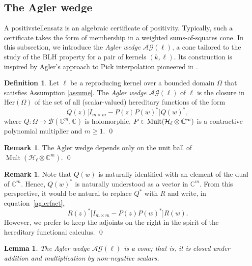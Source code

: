 \documentclass[a4paper,reqno,index]{amsart}
\newcommand{\df}[1]{{\textit{#1}}{\index{#1}}}
\numberwithin{equation}{section}
\newtheorem{lemma}[theorem]{Lemma}
\newcommand{\CC}{\mathbb{C}}
\newcommand{\Mult}{\operatorname{Mult}}
\newcommand{\cH}{\mathcal{H}}
\theoremstyle{definition}
\newtheorem{definition}[theorem]{Definition}
\newtheorem{remark}[theorem]{Remark}
\begin{document}
\subsection{The Agler wedge}
 A positivstellensatz is an algebraic certificate of positivity. Typically, such a certificate takes the form of membership in a weighted sums-of-squares cone. In this subsection, we introduce the \df{Agler wedge} $\mathcal{AG}(\ell)$, a cone tailored to the study of the BLH property for a pair of kernels $(k,\ell)$. Its construction is inspired by Agler's approach to Pick interpolation pioneered in \cite{Hellinger}. 


\begin{definition} \label{Aglerwedge}
 Let $\ell$ be a reproducing kernel over a bounded domain $\Omega$ that satisfies Assumption \ref{assume}.  The \df{Agler wedge} 
 \df{$\mathcal{AG}(\ell)$} of $\ell$ is the closure in $\text{Her}(\Omega)$ of the set of all
 (scalar-valued) hereditary functions of the form
\begin{equation}\label{aglerfact}
    Q(z)\big[I_{m\times m}-P(z)P(w)^* \big]Q(w)^*, 
\end{equation}
where  $Q:\Omega\to\mathcal{B}(\mathbb{C}^{m}, \mathbb{C})$ is holomorphic, $P\in\textup{Mult}(\mathcal{H}_{\ell}\otimes\CC^{m})$ is a contractive polynomial multiplier and $m\ge 1$.
\qed
\end{definition}

\begin{remark}\rm
 \label{r:AG-only-on-mults}
    The Agler wedge depends only on the unit ball of $\Mult(\cH_\ell\otimes\mathbb{C}^m).$
\qed\end{remark}
   \begin{remark} Note that $Q(w)$ is naturally identified with an element of the dual of $\CC^m.$ Hence,
     $Q(w)^*$ is naturally understood as a vector in $\CC^m.$  From this perspective, it would
     be natural to replace $Q^*$ with $R$ and write, in equation~\eqref{aglerfact},
\[
  R(z)^*\big[I_{m\times m}-P(z)P(w)^* \big]R(w).
\]
 However, we prefer to keep the adjoints on the right in the spirit of the hereditary functional calculus.  
 \qed\end{remark}


\begin{lemma}\label{closed-under-sums}
The Agler wedge $\mathcal{AG}(\ell)$  is a cone; that is, it  is closed under addition
and multiplication by non-negative scalars.
\end{lemma}
\end{document}
